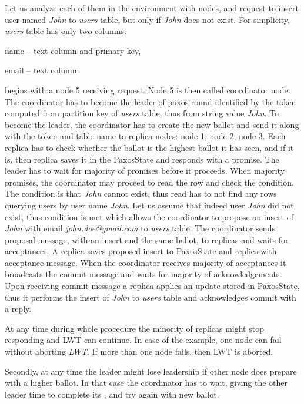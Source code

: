 Let us analyze each of them in the environment with  nodes,  and request to insert user named \emph{John} to \emph{users} table, but only if \emph{John} does not exist. For simplicity, \emph{users} table has only two columns: \begin{enumerate*}[label=\alph*)]
\item name -- text column and primary key, \item email -- text column. \end{enumerate*} \lwt begins with a node 5
receiving request. Node 5 is then called coordinator node. The coordinator has to become the leader of paxos round
identified by the token computed from partition key of \emph{users} table, thus from string value \emph{John}. To
become the leader, the coordinator has to create the new ballot and send it along with the token and table name to
replica nodes: node 1, node 2, node 3. Each replica has to check whether the ballot is the highest ballot it has seen, and if it is, then replica saves it in the PaxosState and responds with a promise. The leader has to wait for majority of promises before it proceeds. When majority promises, the coordinator may proceed to read the row and check the condition. The condition is that \emph{John} cannot exist, thus read has to not find any rows querying users by user name \emph{John}. Let us assume that indeed user \emph{John} did not exist, thus condition is met which allows the coordinator to propose an insert of \emph{John} with email \emph{john.doe@gmail.com} to \emph{users} table. The coordinator sends proposal message, with an insert and the same ballot, to replicas and waits for acceptances. A replica saves proposed insert to PaxosState and replies with acceptance message.
When the coordinator receives majority of acceptances it broadcasts the commit message and waits for majority of acknowledgements. Upon receiving commit message a replica applies an update stored in PaxosState, thus it performs the insert of \emph{John} to \emph{users} table and acknowledges commit with a reply.

At any time during whole procedure the minority of replicas might stop responding and LWT can continue. In case of the example, one node can fail without aborting \emph{LWT}. If more than one node fails, then LWT is aborted. 

Secondly, at any time the leader might lose leadership if other node does prepare with a higher ballot. In that case the coordinator has to wait, giving the other leader time to complete its \lwt, and try again with new ballot.

